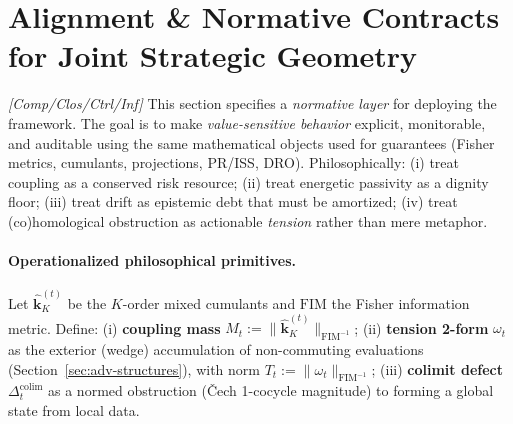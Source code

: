 \documentclass[10pt]{article}
\newcommand{\FIM}{\mathrm{FIM}}
\newcommand{\layertag}[1]{\textup{[#1]}}
\begin{document}
\appendix

\section{Alignment \& Normative Contracts for Joint Strategic Geometry}\label{app:alignment}

\emph{\layertag{Comp/Clos/Ctrl/Inf}} This section specifies a \emph{normative layer} for deploying the framework. The goal is to make \emph{value-sensitive behavior} explicit, monitorable, and auditable using the same mathematical objects used for guarantees (Fisher metrics, cumulants, projections, PR/ISS, DRO). Philosophically: (i) treat coupling as a conserved risk resource; (ii) treat energetic passivity as a dignity floor; (iii) treat drift as epistemic debt that must be amortized; (iv) treat (co)homological obstruction as actionable \emph{tension} rather than mere metaphor.

\paragraph{Operationalized philosophical primitives.} Let $\widehat{\mathbf k}_K^{(t)}$ be the $K$-order mixed cumulants and $\FIM$ the Fisher information metric. Define: (i) \textbf{coupling mass} $M_t:=\|\widehat{\mathbf k}_K^{(t)}\|_{\FIM^{-1}}$; (ii) \textbf{tension 2-form} $\omega_t$ as the exterior (wedge) accumulation of non-commuting evaluations (Section~\ref{sec:adv-structures}), with norm $T_t:=\|\omega_t\|_{\FIM^{-1}}$; (iii) \textbf{colimit defect} $\Delta^{\mathrm{colim}}_t$ as a normed obstruction (\v{C}ech 1-cocycle magnitude) to forming a global state from local data.
\end{document}
